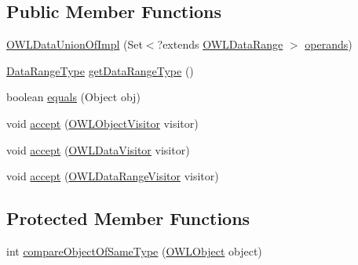 \subsection*{Public Member Functions}
\begin{DoxyCompactItemize}
\item 
\hyperlink{classuk_1_1ac_1_1manchester_1_1cs_1_1owl_1_1owlapi_1_1_o_w_l_data_union_of_impl_ade3d05aadf7dcb4af2a667d35ccd70e1}{O\-W\-L\-Data\-Union\-Of\-Impl} (Set$<$?extends \hyperlink{interfaceorg_1_1semanticweb_1_1owlapi_1_1model_1_1_o_w_l_data_range}{O\-W\-L\-Data\-Range} $>$ \hyperlink{classuk_1_1ac_1_1manchester_1_1cs_1_1owl_1_1owlapi_1_1_o_w_l_nary_data_range_impl_a4536392a3f3322085f03875bc3ac1ef1}{operands})
\item 
\hyperlink{enumorg_1_1semanticweb_1_1owlapi_1_1model_1_1_data_range_type}{Data\-Range\-Type} \hyperlink{classuk_1_1ac_1_1manchester_1_1cs_1_1owl_1_1owlapi_1_1_o_w_l_data_union_of_impl_a2856e9e39e56477f457e4f7562453e0a}{get\-Data\-Range\-Type} ()
\item 
boolean \hyperlink{classuk_1_1ac_1_1manchester_1_1cs_1_1owl_1_1owlapi_1_1_o_w_l_data_union_of_impl_a9c534fb56ca47d1b7b63e68dfb9a6bd9}{equals} (Object obj)
\item 
void \hyperlink{classuk_1_1ac_1_1manchester_1_1cs_1_1owl_1_1owlapi_1_1_o_w_l_data_union_of_impl_a5dee8f5ae0eb7c813a42d0d07b548a22}{accept} (\hyperlink{interfaceorg_1_1semanticweb_1_1owlapi_1_1model_1_1_o_w_l_object_visitor}{O\-W\-L\-Object\-Visitor} visitor)
\item 
void \hyperlink{classuk_1_1ac_1_1manchester_1_1cs_1_1owl_1_1owlapi_1_1_o_w_l_data_union_of_impl_a57e28ac810052c59502fbbb198744afd}{accept} (\hyperlink{interfaceorg_1_1semanticweb_1_1owlapi_1_1model_1_1_o_w_l_data_visitor}{O\-W\-L\-Data\-Visitor} visitor)
\item 
void \hyperlink{classuk_1_1ac_1_1manchester_1_1cs_1_1owl_1_1owlapi_1_1_o_w_l_data_union_of_impl_af7bcae599869d3d40de3d13803a66b7b}{accept} (\hyperlink{interfaceorg_1_1semanticweb_1_1owlapi_1_1model_1_1_o_w_l_data_range_visitor}{O\-W\-L\-Data\-Range\-Visitor} visitor)
\end{DoxyCompactItemize}
\subsection*{Protected Member Functions}
\begin{DoxyCompactItemize}
\item 
int \hyperlink{classuk_1_1ac_1_1manchester_1_1cs_1_1owl_1_1owlapi_1_1_o_w_l_data_union_of_impl_a2ab1f3d23465327252cc58becb904b8a}{compare\-Object\-Of\-Same\-Type} (\hyperlink{interfaceorg_1_1semanticweb_1_1owlapi_1_1model_1_1_o_w_l_object}{O\-W\-L\-Object} object)
\end{DoxyCompactItemize}
